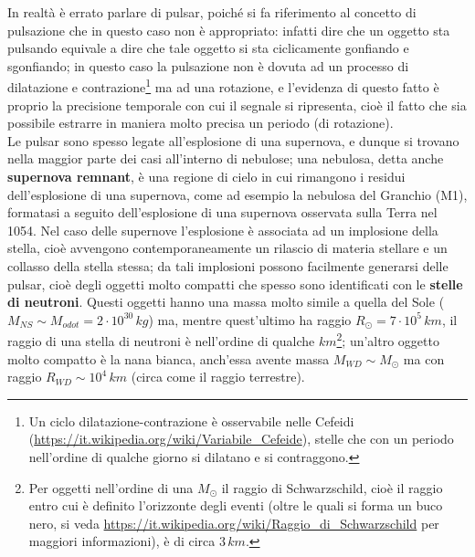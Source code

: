 In realtà è errato parlare di pulsar, poiché si fa riferimento al concetto di pulsazione che in questo caso non è appropriato: infatti dire che un oggetto sta pulsando equivale a dire che tale oggetto si sta ciclicamente gonfiando e sgonfiando; in questo caso la pulsazione non è dovuta ad un processo di dilatazione e contrazione\footnote{Un ciclo dilatazione-contrazione è osservabile nelle Cefeidi (\url{https://it.wikipedia.org/wiki/Variabile_Cefeide}), stelle che con un periodo nell'ordine di qualche giorno si dilatano e si contraggono.} ma ad una rotazione, e l'evidenza di questo fatto è proprio la precisione temporale con cui il segnale si ripresenta, cioè il fatto che sia possibile estrarre in maniera molto precisa un periodo (di rotazione).\\
Le pulsar sono spesso legate all'esplosione di una supernova, e dunque si trovano nella maggior parte dei casi all'interno di nebulose; una nebulosa, detta anche \textbf{supernova remnant}, è una regione di cielo in cui rimangono i residui dell'esplosione di una supernova, come ad esempio la nebulosa del Granchio (M1), formatasi a seguito dell'esplosione di una supernova osservata sulla Terra nel 1054. Nel caso delle supernove l'esplosione è associata ad un implosione della stella, cioè avvengono contemporaneamente un rilascio di materia stellare e un collasso della stella stessa; da tali implosioni possono facilmente generarsi delle pulsar, cioè degli oggetti molto compatti che spesso sono identificati con le \textbf{stelle di neutroni}. Questi oggetti hanno una massa molto simile a quella del Sole ($M_{NS} \sim M_{odot}=2 \cdot 10^30 \, kg$) ma, mentre quest'ultimo ha raggio $R_{\odot}= 7 \cdot 10^5 \, km$, il raggio di una stella di neutroni è nell'ordine di qualche $km$\footnote{Per oggetti nell'ordine di una $M_{\odot}$ il raggio di Schwarzschild, cioè il raggio entro cui è definito l'orizzonte degli eventi (oltre le quali si forma un buco nero, si veda \url{https://it.wikipedia.org/wiki/Raggio_di_Schwarzschild} per maggiori informazioni), è di circa $3 \, km$.}; un'altro oggetto molto compatto è la nana bianca, anch'essa avente massa $M_{WD} \sim M_{\odot}$ ma con raggio $R_{WD} \sim 10^4 \, km$ (circa come il raggio terrestre).

\clearpage


